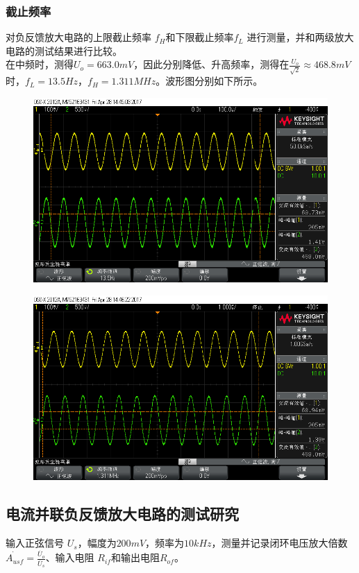 \documentclass[12pt,a4paper]{article}
\begin{document}
\begin{spacing}{1.3}
\subsubsection{截止频率}
对负反馈放大电路的上限截止频率 $f_H 和下限截止频率 f_L$ 进行测量，并和两级放大电路的测试结果进行比较。\\
在中频时，测得$U_o=663.0mV$，因此分别降低、升高频率，测得在$\frac{U_o}{\sqrt{2}}\approx 468.8mV$时，$f_L=13.5Hz，f_H=1.311MHz$。波形图分别如下所示。
\begin{figure}[H]
\centering
\includegraphics[width=\textwidth]{scope_5.png}
\end{figure}
\begin{figure}[H]
\centering
\includegraphics[width=\textwidth]{scope_6.png}
\end{figure}
\subsection{电流并联负反馈放大电路的测试研究}
输入正弦信号 $U_s ，幅度为 200mV，频率为 10kHz$，测量并记录闭环电压放大倍数$\dot{A_{usf}}=\frac{\dot{U_o}}{\dot{U_s}}$、输入电阻 $R_{if} 和输出电阻 R_{of}$。

\end{spacing}
\end{document}

